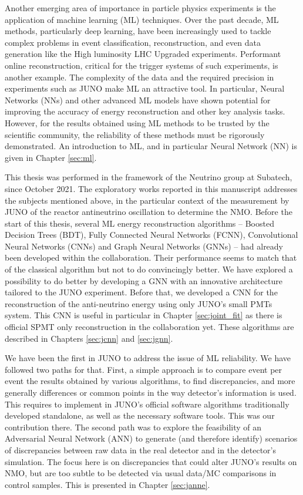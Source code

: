 \hfill

Another emerging area of importance in particle physics experiments is the application of machine learning (ML) techniques. Over the past decade, ML methods, particularly deep learning, have been increasingly used to tackle complex problems in event classification, reconstruction, and even data generation like the High luminosity LHC Upgraded experiments. Performant online reconstruction, critical for the trigger systems of such
 experiments, is another example. The complexity of the data and the required precision in experiments such as JUNO make ML an attractive tool. In particular, Neural Networks (NNs) and other advanced ML models have shown potential for improving the accuracy of energy reconstruction and other key analysis tasks. However, for the results obtained using ML methods to be trusted by the scientific community, the reliability of these methods must be rigorously demonstrated.
An introduction to ML, and in particular Neural Network (NN) is given in Chapter \ref{sec:ml}.

\hfill

This thesis was performed in the framework of the Neutrino group at Subatech, since October 2021. The exploratory works reported in this manuscript addresses the subjects mentioned above, in the particular context of the measurement by JUNO of the reactor antineutrino
oscillation to determine the NMO.
Before the start of this thesis, several ML energy reconstruction algorithms -- Boosted Decision Trees (BDT), Fully Connected Neural Networks (FCNN), Convolutional Neural Networks (CNNs) and Graph Neural Networks (GNNs) --  had already been developed within
the collaboration. Their performance seems to match that of the classical algorithm but not to do convincingly better. We have explored a possibility
to do better by developing a GNN with an innovative architecture tailored to the JUNO experiment. Before that, we developed a CNN for the reconstruction of the anti-neutrino
energy using only JUNO's small PMTs system.
This CNN is useful in particular in Chapter \ref{sec:joint_fit} as there is official SPMT only reconstruction in the collaboration yet. These algorithms are described in Chapters \ref{sec:jcnn} and \ref{sec:jgnn}.

We have been the first in JUNO to address the issue of ML reliability.
We have followed two paths for that.
First, a simple approach is to compare event per event the results obtained by various algorithms, to find discrepancies, and more generally differences or common points in the way detector's information is used.
This requires to implement in JUNO's official software algorithms traditionally developed standalone, as well as the necessary software tools. This was our contribution there.
The second path was to explore the feasibility of an Adversarial Neural Network (ANN) to generate (and therefore identify) scenarios of discrepancies
between raw data in the real detector and in the detector's simulation.
The focus here is on discrepancies that could alter JUNO's results on NMO, but are too subtle to be detected via usual data/MC comparisons in control samples.
This is presented in Chapter \ref{sec:janne}.


